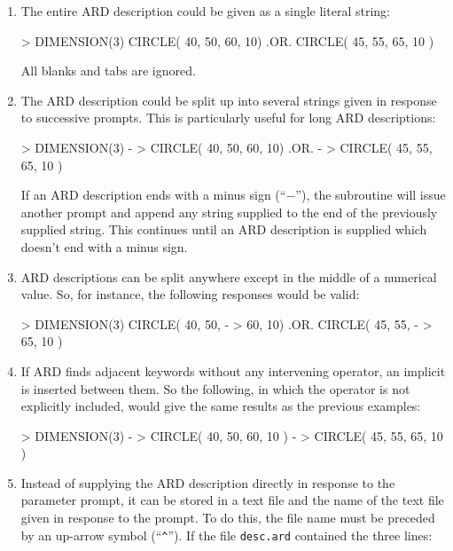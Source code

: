 \documentclass[11pt]{starlink}
\begin{document}
\begin{enumerate}

\item The entire ARD description could be given as a single literal string:

\small
\begin{terminalv}
      > DIMENSION(3) CIRCLE( 40, 50, 60, 10) .OR. CIRCLE( 45, 55, 65, 10 )
\end{terminalv}
\normalsize

All blanks and tabs are ignored.

\item The ARD description could be split up into several strings given in
response to successive prompts. This is particularly useful for long ARD
descriptions:

\small
\begin{terminalv}
      > DIMENSION(3) -
      > CIRCLE( 40, 50, 60, 10) .OR. -
      > CIRCLE( 45, 55, 65, 10 )
\end{terminalv}
\normalsize

If an ARD description ends with a minus sign (``$-$''), the  subroutine
will issue another prompt and append any string supplied to the end of the
previously supplied string. This continues until an ARD description is supplied
which doesn't end with a minus sign.

\item ARD descriptions can be split anywhere except in the middle of a numerical
value. So, for instance, the following responses would be valid:

\small
\begin{terminalv}
      > DIMENSION(3) CIRCLE( 40, 50, -
      > 60, 10) .OR. CIRCLE( 45, 55, -
      > 65, 10 )
\end{terminalv}
\normalsize

\item If ARD finds adjacent keywords without any intervening operator, an
implicit  is inserted between them. So the following, in which the 
operator is not explicitly included, would give the same results as the previous
examples:

\small
\begin{terminalv}
      > DIMENSION(3) -
      > CIRCLE( 40, 50, 60, 10 ) -
      > CIRCLE( 45, 55, 65, 10 )
\end{terminalv}
\normalsize

\item Instead of supplying the ARD description directly in response to the
parameter prompt, it can be stored in a text file and the name of the text file
given in response to the prompt. To do this, the file name must be
preceded by an up-arrow symbol (``\verb+^+''). If the file \verb+desc.ard+
contained the three lines:


\end{enumerate}
\end{document}
